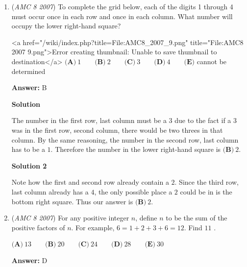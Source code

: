 \begin{enumerate}
 



\textbf{Solution 3 (Cheese, Don't use in competition unless stuck)}

$4.5$ is the only one that isn't an integer, and is the odd one out. 
 \begin{align*} &\boxed{\textbf{(B)}\ 4.5}. \end{align*}




	\item (\textit{AMC 8 2007}) To complete the grid below, each of the digits 1 through 4 must occur once
in each row and once in each column. What number will occupy the lower
right-hand square?


 <a href="/wiki/index.php?title=File:AMC8\_2007\_9.png" title="File:AMC8 2007 9.png">Error creating thumbnail: Unable to save thumbnail to destination</a>
$\textbf{(A)}\ 1 \qquad \textbf{(B)}\ 2 \qquad \textbf{(C)}\ 3 \qquad \textbf{(D)}\ 4 \qquad \textbf{(E)}$ cannot be determined


 
 \textbf{Answer: }B



\textbf{Solution}

The number in the first row, last column must be a $3$ due to the fact if a $3$ was in the first row, second column, there would be two threes in that column. By the same reasoning, the number in the second row, last column has to be a $1$. Therefore the number in the lower right-hand square is $\boxed{\textbf{(B)}\ 2}$.

 



\textbf{Solution 2}

Note how the first and second row already contain a $2$. Since the third row, last column already has a $4$, the only possible place a $2$ could be in is the bottom right square. Thus our answer is $\boxed{\textbf{(B)}\ 2}$.

 


	\item (\textit{AMC 8 2007}) For any positive integer $n$, define $\boxed{n}$ to be the sum of the positive factors of $n$.
For example, $\boxed{6} = 1 + 2 + 3 + 6 = 12$. Find $\boxed{\boxed{11}}$ .


 $\textbf{(A)}\ 13 \qquad \textbf{(B)}\ 20 \qquad \textbf{(C)}\ 24 \qquad \textbf{(D)}\ 28 \qquad \textbf{(E)}\ 30$

 \textbf{Answer: }D




\end{enumerate}
